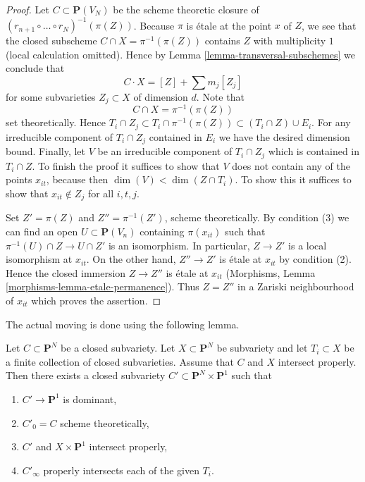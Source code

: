 \begin{proof}
\medskip\noindent
Let $C \subset \mathbf{P}(V_N)$ be the scheme theoretic closure of
$(r_{n + 1} \circ \ldots \circ r_N)^{-1}(\pi(Z))$. Because $\pi$
is \'etale at the point $x$ of $Z$, we see that the closed subscheme
$C \cap X = \pi^{-1}(\pi(Z))$
contains $Z$ with multiplicity $1$ (local calculation omitted).
Hence by Lemma \ref{lemma-transversal-subschemes} we conclude that
$$
C \cdot X = [Z] + \sum m_j[Z_j]
$$
for some subvarieties $Z_j \subset X$ of dimension $d$. Note that
$$
C \cap X = \pi^{-1}(\pi(Z))
$$
set theoretically. Hence
$T_i \cap Z_j \subset T_i \cap \pi^{-1}(\pi(Z)) \subset (T_i \cap Z) \cup E_i$.
For any irreducible component of $T_i \cap Z_j$ contained in $E_i$ we
have the desired dimension bound. Finally, let $V$ be an irreducible
component of $T_i \cap Z_j$ which is contained in $T_i \cap Z$. To finish
the proof it suffices to show that $V$ does not contain any of the
points $x_{it}$, because then $\dim(V) < \dim(Z \cap T_i)$.
To show this it suffices to show that $x_{it} \not \in Z_j$
for all $i, t, j$.

\medskip\noindent
Set $Z' = \pi(Z)$ and $Z'' = \pi^{-1}(Z')$, scheme theoretically. By
condition (3) we can find an open $U \subset \mathbf{P}(V_n)$ containing
$\pi(x_{it})$ such that $\pi^{-1}(U) \cap Z \to U \cap Z'$ is an isomorphism.
In particular, $Z \to Z'$ is a local isomorphism at $x_{it}$.
On the other hand, $Z'' \to Z'$ is \'etale at $x_{it}$ by condition (2).
Hence the closed immersion $Z \to Z''$ is \'etale at $x_{it}$
(Morphisms, Lemma \ref{morphisms-lemma-etale-permanence}).
Thus $Z = Z''$ in a Zariski neighbourhood of $x_{it}$ which proves
the assertion.
\end{proof}

\noindent
The actual moving is done using the following lemma.

\begin{lemma}
\label{lemma-move}
Let $C \subset \mathbf{P}^N$ be a closed subvariety.
Let $X \subset \mathbf{P}^N$ be subvariety and let $T_i \subset X$
be a finite collection of closed subvarieties.
Assume that $C$ and $X$ intersect properly.
Then there exists a closed subvariety
$C' \subset \mathbf{P}^N \times \mathbf{P}^1$ such that
\begin{enumerate}
\item $C' \to \mathbf{P}^1$ is dominant,
\item $C'_0 = C$ scheme theoretically,
\item $C'$ and $X \times \mathbf{P}^1$ intersect properly,
\item $C'_\infty$ properly intersects each of the given $T_i$.
\end{enumerate}
\end{lemma}

